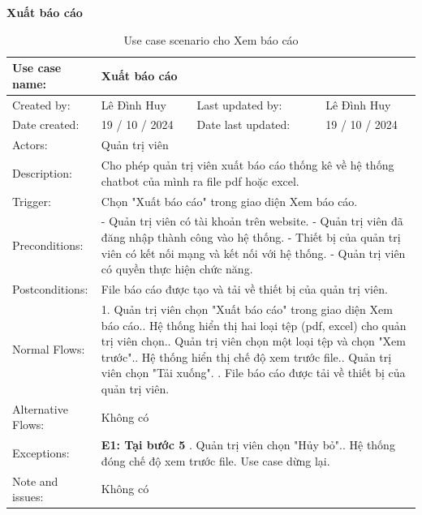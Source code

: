 \textbf{Xuất báo cáo}
\begin{table}[H]
    \centering
    \begin{tabular}{|l|l|l|l|} 
        \hline
        Use case name: & \multicolumn{3}{|l|}{Xuất báo cáo} \\
        \hline
        Created by: & Lê Đình Huy & Last updated by: & Lê Đình Huy \\
        \hline
        Date created: & 19 / 10 / 2024 & Date last updated: & 19 / 10 / 2024 \\
        \hline
        Actors: & \multicolumn{3}{|l|}{Quản trị viên} \\
        \hline
        Description: & \multicolumn{3}{|p{12cm}|}{Cho phép quản trị viên xuất báo cáo thống kê về hệ thống chatbot của mình ra file pdf hoặc excel.} \\ 
        \hline
        Trigger: & \multicolumn{3}{|p{12cm}|}{Chọn "Xuất báo cáo" trong giao diện Xem báo cáo.} \\
        \hline
        Preconditions: & \multicolumn{3}{|p{12cm}|}{- Quản trị viên có tài khoản trên website. \newline
        - Quản trị viên đã đăng nhập thành công vào hệ thống. \newline
        - Thiết bị của quản trị viên có kết nối mạng và kết nối với hệ thống. \newline
        - Quản trị viên có quyền thực hiện chức năng.} \\
        \hline
        Postconditions: & \multicolumn{3}{|p{12cm}|}{File báo cáo được tạo và tải về thiết bị của quản trị viên.} \\
        \hline
        Normal Flows: & \multicolumn{3}{|p{12cm}|}{1. Quản trị viên chọn "Xuất báo cáo" trong giao diện Xem báo cáo.\newline
        2. Hệ thống hiển thị hai loại tệp (pdf, excel) cho quản trị viên chọn.\newline
        3. Quản trị viên chọn một loại tệp và chọn "Xem trước".\newline
        4. Hệ thống hiển thị chế độ xem trước file.\newline
        5. Quản trị viên chọn "Tải xuống". \newline
        6. File báo cáo được tải về thiết bị của quản trị viên.}\\
        \hline
        Alternative Flows: & \multicolumn{3}{|p{12cm}|}{Không có} \\
        \hline
        Exceptions: & \multicolumn{3}{|p{12cm}|}{
        \textbf{E1: Tại bước 5} \newline
        5.1. Quản trị viên chọn "Hủy bỏ".\newline
        5.2. Hệ thống đóng chế độ xem trước file.\newline
        Use case dừng lại.
        } \\
        \hline
        Note and issues: & \multicolumn{3}{|p{12cm}|}{Không có} \\
        \hline
    \end{tabular}
    \caption{Use case scenario cho Xem báo cáo}
\end{table}

